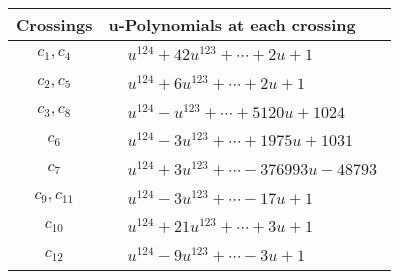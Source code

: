 \documentclass[1p]{elsarticle_modified}
\theoremstyle{definition}
\begin{document}
\begin{tabular}{m{50pt}|m{274pt}}
Crossings & \hspace{64pt}u-Polynomials at each crossing \\
\hline $$\begin{aligned}c_{1},c_{4}\end{aligned}$$&$\begin{aligned}
&u^{124}+42 u^{123}+\cdots+2 u+1
\end{aligned}$\\
\hline $$\begin{aligned}c_{2},c_{5}\end{aligned}$$&$\begin{aligned}
&u^{124}+6 u^{123}+\cdots+2 u+1
\end{aligned}$\\
\hline $$\begin{aligned}c_{3},c_{8}\end{aligned}$$&$\begin{aligned}
&u^{124}- u^{123}+\cdots+5120 u+1024
\end{aligned}$\\
\hline $$\begin{aligned}c_{6}\end{aligned}$$&$\begin{aligned}
&u^{124}-3 u^{123}+\cdots+1975 u+1031
\end{aligned}$\\
\hline $$\begin{aligned}c_{7}\end{aligned}$$&$\begin{aligned}
&u^{124}+3 u^{123}+\cdots-376993 u-48793
\end{aligned}$\\
\hline $$\begin{aligned}c_{9},c_{11}\end{aligned}$$&$\begin{aligned}
&u^{124}-3 u^{123}+\cdots-17 u+1
\end{aligned}$\\
\hline $$\begin{aligned}c_{10}\end{aligned}$$&$\begin{aligned}
&u^{124}+21 u^{123}+\cdots+3 u+1
\end{aligned}$\\
\hline $$\begin{aligned}c_{12}\end{aligned}$$&$\begin{aligned}
&u^{124}-9 u^{123}+\cdots-3 u+1
\end{aligned}$\\
\hline
\end{tabular}\\~\\
\end{document}
